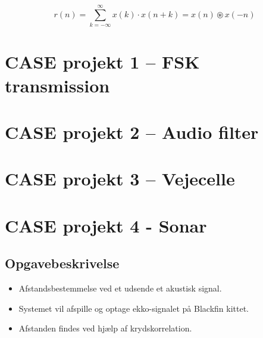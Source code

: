 \documentclass[danish]{article}
\begin{document}
\begin{equation}
r(n) = \sum_{k=-\infty}^{\infty} x(k) \cdot x(n+k) = x(n) \circledast x(-n)
\end{equation}

\newpage
\section{CASE projekt 1 – FSK transmission}
\newpage
\section{CASE projekt 2 – Audio filter}
\newpage
\section{CASE projekt 3 – Vejecelle}

\newpage
\section{CASE projekt 4 - Sonar}
\subsection{Opgavebeskrivelse}
\begin{itemize}
	\item Afstandsbestemmelse ved et udsende et akustisk signal.
	\item Systemet vil afspille og optage ekko-signalet på Blackfin kittet.
	\item Afstanden findes ved hjælp af krydskorrelation. 
\end{itemize}
	
\end{document}
